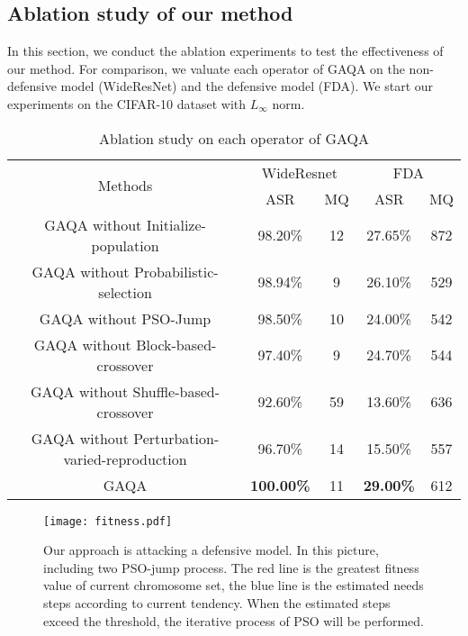 \documentclass[lettersize,journal]{IEEEtran}
\begin{document}
	
	
	\subsection{Ablation study of our method} 
	In this section, we conduct the ablation experiments to test the effectiveness of our method. For comparison, we valuate each operator of GAQA on the non-defensive model (WideResNet) and the defensive model (FDA). We start our experiments on the CIFAR-10 dataset with $L_\infty$ norm. 
	
	
	\begin{table}[!b]
		\setlength\tabcolsep{1pt}
		\centering
		\caption{Ablation study on each operator of GAQA}
		\begin{tabular}{ccccc}
			\toprule
			\multirow{2}[4]{*}{Methods} & \multicolumn{2}{c}{WideResnet} & \multicolumn{2}{c}{FDA \cite{rebuffi2021fixing} } \\
			\cmidrule(lr){2-3} \cmidrule(lr){4-5}           & ASR   & MQ    & ASR   & MQ \\
			\midrule
			GAQA without Initialize-population & 98.20\% & 12  & 27.65\% & 872 \\
			GAQA without Probabilistic-selection & 98.94\% & 9  & 26.10\% & 529 \\
			GAQA without PSO-Jump & 98.50\% & 10 & 24.00\% & 542 \\
			GAQA without Block-based-crossover  & 97.40\% & 9   & 24.70\% & 544 \\
			GAQA without Shuffle-based-crossover & 92.60\% & 59 & 13.60\% & 636 \\
			GAQA without Perturbation-varied-reproduction& 96.70\% & 14  & 15.50\% & 557 \\
			GAQA & \textbf{100.00\%} & 11  & \textbf{29.00\%}  & 612 \\
			\bottomrule
		\end{tabular}
		\label{tab:vaild1}
	\end{table}
	
	
	\begin{figure}[t]
		\flushleft  
		\texttt{[image: fitness.pdf]}
		\centering \caption{Our approach is attacking a defensive model. In this picture, including two PSO-jump process. The red line is the greatest fitness value of current chromosome set, the blue line is the estimated needs steps according to current tendency. When the estimated steps exceed the threshold, the iterative process of PSO will be performed. }
		\label{fig:process}
	\end{figure}
	
\end{document}
